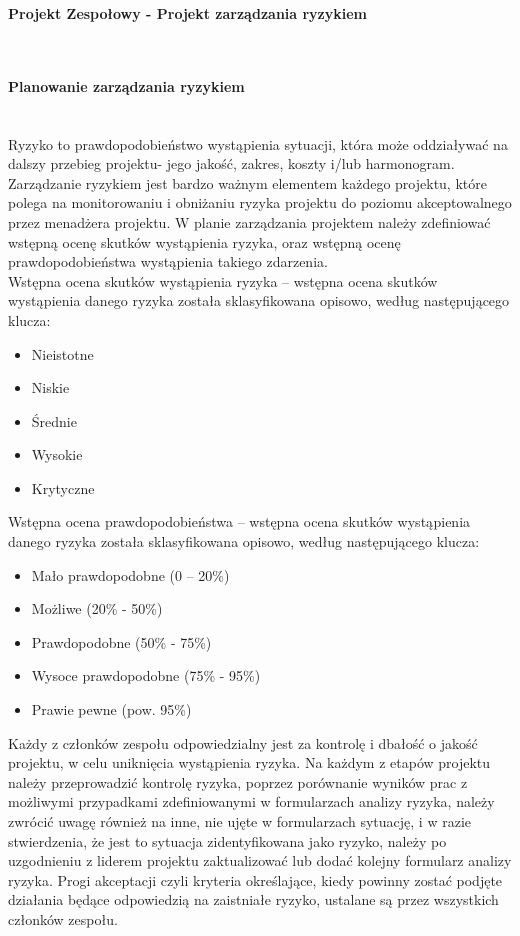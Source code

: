 \documentclass{article}
\begin{document}
\begin{center}
\textbf{Projekt Zespołowy - Projekt zarządzania ryzykiem}
\end{center}
\mbox{}\\
\paragraph{Planowanie zarządzania ryzykiem}
\mbox{}\\

Ryzyko to prawdopodobieństwo wystąpienia sytuacji, która może oddziaływać na dalszy przebieg projektu- jego jakość, zakres, koszty i/lub harmonogram.
Zarządzanie ryzykiem jest bardzo ważnym elementem każdego projektu, które polega na monitorowaniu i obniżaniu ryzyka projektu do poziomu akceptowalnego przez menadżera projektu.
W planie zarządzania projektem należy zdefiniować wstępną ocenę skutków wystąpienia ryzyka, oraz wstępną ocenę prawdopodobieństwa wystąpienia takiego zdarzenia.
\mbox{}\\

Wstępna ocena skutków wystąpienia ryzyka – wstępna ocena skutków wystąpienia danego ryzyka została sklasyfikowana opisowo, według następującego klucza:
\begin{itemize}
\item{Nieistotne}
\item{Niskie}
\item{Średnie}
\item{Wysokie}
\item{Krytyczne}
\end{itemize}

Wstępna ocena prawdopodobieństwa – wstępna ocena skutków wystąpienia danego ryzyka została sklasyfikowana opisowo, według następującego klucza:
\begin{itemize}
\item{Mało prawdopodobne (0 – 20\%)}
\item{Możliwe (20\% - 50\%)}
\item{Prawdopodobne (50\% - 75\%)}
\item{Wysoce prawdopodobne (75\% - 95\%)}
\item{Prawie pewne (pow. 95\%)}
\end{itemize}


Każdy z członków zespołu odpowiedzialny jest za kontrolę i dbałość o jakość projektu, w celu uniknięcia wystąpienia ryzyka.  
Na każdym z etapów projektu należy przeprowadzić kontrolę ryzyka, poprzez porównanie wyników prac z możliwymi przypadkami zdefiniowanymi w formularzach analizy ryzyka, należy zwrócić uwagę również na inne, nie ujęte w formularzach sytuację, i w razie stwierdzenia, że jest to sytuacja zidentyfikowana jako ryzyko, należy po uzgodnieniu z liderem projektu zaktualizować lub dodać kolejny formularz analizy ryzyka. 
Progi akceptacji czyli kryteria określające, kiedy powinny zostać podjęte działania będące odpowiedzią na zaistniałe ryzyko, ustalane są przez wszystkich członków zespołu.
\end{document}
